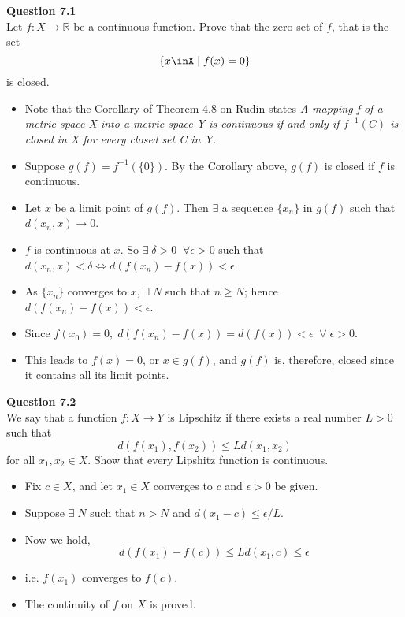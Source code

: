 \documentclass[12pt]{article}
\begin{document}



\textbf{Question 7.1}\\
Let $f\colon X\rightarrow \mathbb{R}$ be a continuous function. Prove that the zero set of $f$, that is the set 
$$\{x\inX\;|\;f(x)=0\}$$ is closed.
\begin{itemize}
    \item Note that the Corollary of Theorem 4.8 on Rudin states {\sl A mapping f of a metric space X into a metric space Y is continuous if and only if $f^{-1}(C)$ is closed in X for every closed set C in Y.}
    \item Suppose $g(f) = f^{-1}(\{0\})$. By the Corollary above, $g(f)$ is closed if $f$ is continuous.\\
    
    \item Let $x$ be a limit point of $g(f)$. Then $\exists$ a sequence $\{x_n\}$ in $g(f)$ such that $d(x_n,x)\rightarrow 0$.
    \item $f$ is continuous at $x$. So $\exists\; \delta>0\;\;\forall \epsilon>0$ such that $d(x_n,x)<\delta \Leftrightarrow d(f(x_n)-f(x))<\epsilon$.
    \item As $\{x_n\}$ converges to $x$, $\exists\; N$ such that $n\ge N$; hence $d(f(x_n)-f(x))<\epsilon$.
    \item Since $f(x_0)=0,\; d(f(x_n)-f(x)) = d(f(x)) < \epsilon \;\;\forall\; \epsilon>0.$
    \item This leads to $f(x) = 0$, or $x\in g(f)$, and $g(f)$ is, therefore, closed since it contains all its limit points.
    
\end{itemize}


\vspace{1.5\baselineskip}
\textbf{Question 7.2}\\
We say that a function $f\colon X\rightarrow Y$ is Lipschitz if there exists a real number $L>0$ such that 
$$d(f(x_1),f(x_2))\le Ld(x_1,x_2)$$ for all $x_1,x_2\in X$.
Show that every Lipshitz function is continuous.
\begin{itemize}
    \item Fix $c\in X$, and let $x_1\in X$ converges to $c$ and $\epsilon>0$ be given.
    \item Suppose $\exists\; N$ such that $n>N$ and $d(x_1 - c) \le \epsilon / L$.
    \item Now we hold, $$d(f(x_1)-f(c)) \le Ld(x_1,c)\le \epsilon$$
    \item i.e. $f(x_1)$ converges to $f(c)$.
    \item The continuity of $f$ on $X$ is proved.
\end{itemize}
\end{document}
